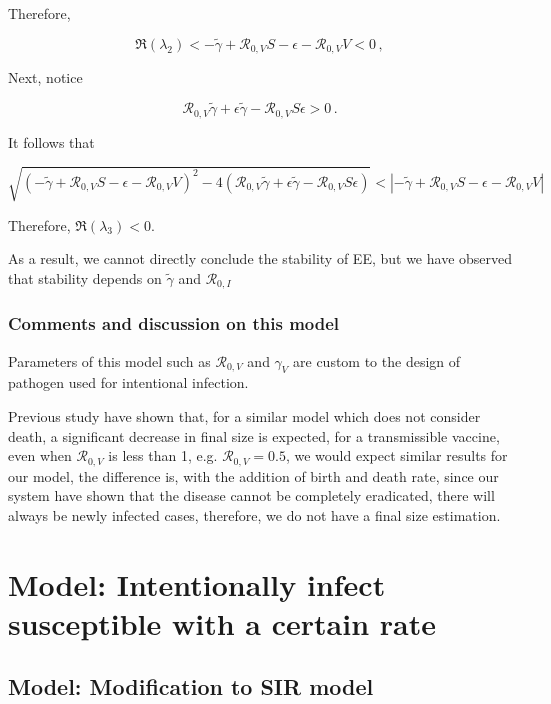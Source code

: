 \documentclass[12pt]{article}
\newcommand{\R}{\mathcal{R}}
\begin{document}
Therefore,
\begin{linenomath*}
\begin{equation}
\Re(\lambda_2)<-\tilde{\gamma}+\R_{0,V}S-\epsilon-\R_{0,V}V<0\,,
\end{equation}
\end{linenomath*}

Next, notice
\begin{linenomath*}
\begin{equation}
\R_{0,V}\tilde{\gamma}+\epsilon\tilde{\gamma}-\R_{0,V}S\epsilon>0\,.
\end{equation}
\end{linenomath*}
It follows that
\begin{linenomath*}
\begin{equation}
\sqrt{(-\tilde{\gamma}+\R_{0,V} S-\epsilon-\R_{0,V}V)^2-4(\R_{0,V}\tilde{\gamma}+\epsilon\tilde{\gamma}-\R_{0,V}S\epsilon)}<|-\tilde{\gamma}+\R_{0,V} S-\epsilon-\R_{0,V}V|
\end{equation}
\end{linenomath*}
Therefore, $\Re(\lambda_3)<0$.

As a result, we cannot directly conclude the stability of EE, but we have observed that stability depends on $\tilde{\gamma}$ and $\R_{0,I}$

\subsubsection{Comments and discussion on this model}

Parameters of this model such as $\R_{0,V}$ and $\gamma_V$ are custom to the design of pathogen used for intentional infection. 

Previous study have shown that, for a similar model which does not consider death, a significant decrease in final size is expected, for a transmissible vaccine, even when $\R_{0,V}$ is less than 1, e.g. $\R_{0,V}=0.5$, we would expect similar results for our model, the difference is, with the addition of birth and death rate, since our system have shown that the disease cannot be completely eradicated, there will always be newly infected cases, therefore, we do not have a final size estimation. 

\section{Model: Intentionally infect susceptible with a certain rate}
\subsection{Model: Modification to SIR model}
\end{document}
